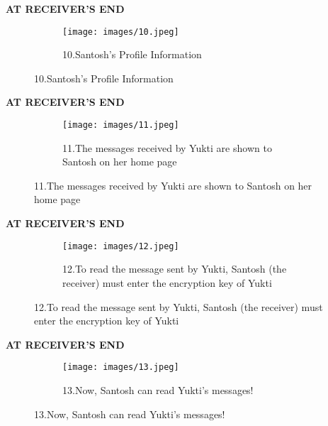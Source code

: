 \documentclass{beamer}
\begin{document}
\begin{frame}
\begin{tcolorbox}
\begin{center}
\textsc{\textbf{\textcolor{byzantium}{AT RECEIVER'S END}}}
\end{center}
\end{tcolorbox}
\begin{figure}
\centering
\begin{subfigure}{\textwidth}
  \centering
  \texttt{[image: images/10.jpeg]}
  \caption{10.Santosh’s Profile Information }
  \label{fig:sub1}
\end{subfigure}
\end{figure}
\end{frame}

\begin{frame}
\begin{tcolorbox}
\begin{center}
\textsc{\textbf{\textcolor{byzantium}{AT RECEIVER'S END}}}
\end{center}
\end{tcolorbox}
\begin{figure}
\centering
\begin{subfigure}{\textwidth}
  \centering
  \texttt{[image: images/11.jpeg]}
  \caption{11.The messages received by Yukti are shown to Santosh on her home page}
  \label{fig:sub1}
\end{subfigure}
\end{figure}
\end{frame}


\begin{frame}
\begin{tcolorbox}
\begin{center}
\textsc{\textbf{\textcolor{byzantium}{AT RECEIVER'S END}}}
\end{center}
\end{tcolorbox}
\begin{figure}
\centering
\begin{subfigure}{\textwidth}
  \centering
  \texttt{[image: images/12.jpeg]}
  \caption{12.To read the message sent by Yukti, Santosh (the receiver) must enter the encryption key of Yukti}
  \label{fig:sub1}
\end{subfigure}
\end{figure}
\end{frame}


\begin{frame}
\begin{tcolorbox}
\begin{center}
\textsc{\textbf{\textcolor{byzantium}{AT RECEIVER'S END}}}
\end{center}
\end{tcolorbox}
\begin{figure}
\centering
\begin{subfigure}{\textwidth}
  \centering
  \texttt{[image: images/13.jpeg]}
  \caption{13.Now, Santosh can read Yukti’s messages! }
  \label{fig:sub1}
\end{subfigure}
\end{figure}
\end{frame}
\end{document}
